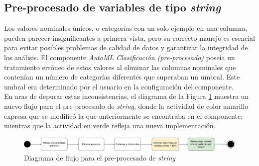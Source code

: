 \subsection{Pre-procesado de variables de tipo \textit{string}}
Los valores nominales únicos, o categorías con un solo ejemplo en una columna, pueden parecer insignificantes a primera vista, pero su correcto manejo es esencial para evitar posibles problemas de calidad de datos y garantizar la integridad de los análisis. El componente \textit{AutoML Clasificación (pre-procesado)} poseía un tratamiento erróneo de estos valores al eliminar las columnas nominales que contenían un número de categorías diferentes que superaban un umbral. Este umbral era determinado por el usuario en la configuración del componente. \\ 
En aras de depurar estas inconsistencias, el diagrama de la Figura \ref{fig:string-preprocs} muestra un nuevo flujo para el pre-procesado de \textit{string}, donde la actividad de color amarillo expresa que se modificó la que anteriormente se encontraba en el componente; mientras que la actividad en verde refleja una nueva implementación.

\begin{figure}[H]
	\centering
	\includegraphics[width=0.95\linewidth]{"figuras/capi 2/preprocesado/string preprocs.drawio"}
	\caption{Diagrama de flujo para el pre-procesado de \textit{string}}
	\label{fig:string-preprocs}
\end{figure}

